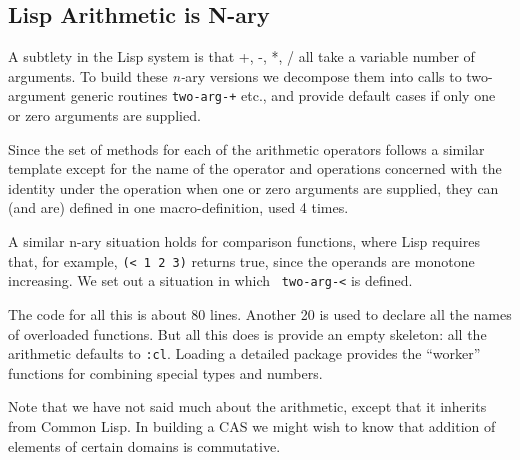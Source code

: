 \documentclass{article}
\begin{document}
{\subsection{Lisp Arithmetic is N-ary} {A subtlety in the Lisp system
is that +, -, *, / all take a variable number of arguments. To build
these {\em n-}ary versions we decompose them into calls to
two-argument generic routines {\tt two-arg-+} etc., and provide default
cases if only one or zero arguments are supplied.

Since the set of methods for each of the arithmetic operators follows
a similar template except for the name of the operator and operations
concerned with the identity under the operation when one or zero
arguments are supplied, they can (and are) defined in one
macro-definition, used 4 times.}

A similar n-ary situation holds for comparison functions, where Lisp
requires that, for example, {\tt (< 1 2 3)} returns true, since the
operands are monotone increasing. We set out a situation in which {\tt
two-arg-<} is defined.

The code for all this is about 80 lines. Another 20 is used to declare
all the names of overloaded functions. But all this does is provide
an empty skeleton: all the arithmetic defaults to {\tt :cl}. Loading
a detailed package provides the ``worker'' functions for combining special
types and numbers.

Note that we have not said much about the arithmetic, except that
it inherits from Common Lisp. In building a CAS we might wish
to know that addition of elements of certain domains is commutative.

}
\end{document}
